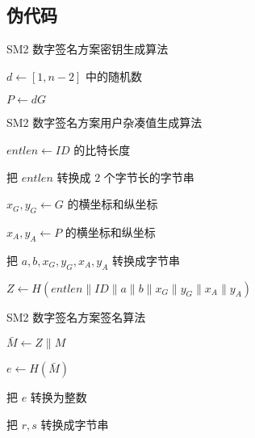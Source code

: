 \documentclass[12pt,a4paper]{article}
\begin{document}
\subsection*{伪代码}

\begin{algorithm}[H]
\caption{SM2 数字签名方案密钥生成算法}

$ d \leftarrow [1, n - 2] $ 中的随机数

$ P \leftarrow d G $

\end{algorithm}

\begin{algorithm}[H]
\caption{SM2 数字签名方案用户杂凑值生成算法}

$ {entlen} \leftarrow {ID} $ 的比特长度


把 $ {entlen} $ 转换成 $ 2 $ 个字节长的字节串

$ x_G, y_G \leftarrow G $ 的横坐标和纵坐标

$ x_A, y_A \leftarrow P $ 的横坐标和纵坐标

把 $ a, b, x_G, y_G, x_A, y_A $ 转换成字节串

$ Z \leftarrow H({entlen} \parallel {ID} \parallel a \parallel b \parallel x_G \parallel y_G \parallel x_A \parallel y_A) $

\end{algorithm}


\begin{algorithm}[H]
\caption{SM2 数字签名方案签名算法}

$ \bar{M} \leftarrow Z \parallel M $

$ e \leftarrow H(\bar{M}) $

把 $ e $ 转换为整数


把 $ r, s $ 转换成字节串

\end{algorithm}
\end{document}
